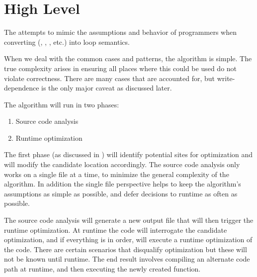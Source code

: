 \section{High Level}
The \algorithm attempts to mimic the assumptions and behavior of programmers when converting \pipelineoperators (, , , etc.) into  loop semantics. 

When we deal with the common cases and patterns, the algorithm is simple.  The true complexity arises in ensuring all places where this could be used do not violate correctness. There are many cases that are accounted for, but write-dependence is the only major caveat as discussed later.

The algorithm will run in two phases:
  \begin{enumerate}
    \item Source code analysis 
    \item Runtime optimization 
  \end{enumerate}

The first phase (as discussed in ) will identify potential sites for optimization and will modify the candidate location accordingly.  The source code analysis only works on a single file at a time, to minimize the general complexity of the algorithm. In addition the single file perspective helps to keep the algorithm's assumptions as simple as possible, and defer decisions to runtime as often as possible.

The source code analysis will generate a new output file that will then trigger the runtime optimization.  At runtime the code will interrogate the candidate optimization, and if everything is in order, will execute a runtime optimization of the code. There are certain scenarios that disqualify optimization but these will not be known until runtime.  The end result involves compiling an alternate code path at runtime, and then executing the newly created function.  